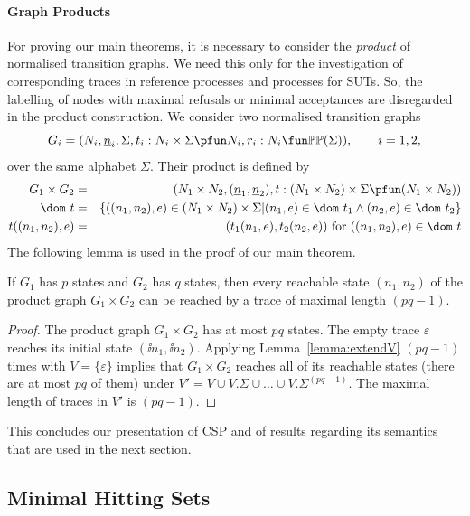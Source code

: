 \paragraph{Graph Products} \label{sec:GP} For proving our main theorems, it is
necessary to consider the \emph{product} of normalised transition graphs. We
need this only for the investigation of corresponding traces in reference
processes and processes for SUTs. So, the labelling of nodes with maximal
refusals or minimal acceptances are disregarded in the product construction.
We consider two normalised transition graphs
\[
G_i = ( N_i, \ii n_i, \Sigma, t_i : N_i\times\Sigma \pfun N_i, r_i : N_i \fun \mathbb{P}\mathbb{P}(\Sigma)),\qquad i = 1,2,
\]
over the same alphabet $\Sigma$. Their product is defined by
%
\begin{eqnarray}
G_1\times G_2 & = & (N_1\times N_2,(\ii n_1,\ii n_2), t:(N_1\times N_2)\times\Sigma\pfun (N_1\times N_2))
\\
\dom~t & = & \{ ((n_1,n_2),e)\in (N_1\times N_2)\times\Sigma | (n_1,e)\in\dom~t_1\wedge (n_2,e) \in\dom~t_2 \}
\\
t((n_1,n_2),e) & = & (t_1(n_1,e),t_2(n_2,e))\ \text{for $((n_1,n_2),e)\in\dom~t$}
\end{eqnarray}
%
The following lemma is used in the proof of our main theorem.
%
\begin{lemma}\label{lemma:reachproduc}
If $G_1$ has $p$ states and $G_2$ has $q$ states, then every reachable state
$(n_1,n_2)$ of the product graph $G_1\times G_2$ can be reached by a trace
of maximal length $(pq-1)$.
\end{lemma}
\begin{proof}
The product graph $G_1\times G_2$ has at most $pq$ states. The empty trace $\varepsilon$
reaches its initial state $(\ii n_1,\ii n_2)$. Applying Lemma~\ref{lemma:extendV}
$(pq-1)$ times with $V=\{\varepsilon \}$ implies that $G_1\times G_2$ reaches
all of its reachable states (there are at most $pq$ of them) under
$V' = V \cup V.\Sigma\cup\dots \cup V.\Sigma^{(pq-1)}$. The maximal length of traces in
$V'$ is $(pq-1)$.
\xbox
\end{proof}
%
This concludes our presentation of CSP and of results regarding its
semantics that are used in the next section.

\subsection{Minimal Hitting Sets}
\label{sec:hit}

